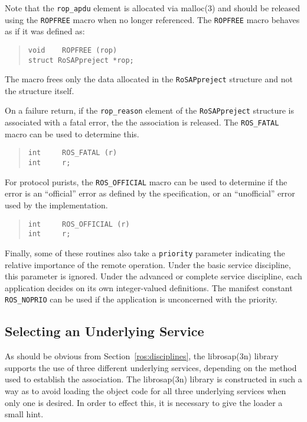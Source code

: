 \empty
Note that the \verb"rop_apdu" element is allocated via \man malloc(3) and
should be released using the \verb"ROPFREE" macro  when no longer referenced.
The \verb"ROPFREE" macro behaves as if it was defined as:
\begin{quote}\small\begin{verbatim}
void    ROPFREE (rop)
struct RoSAPpreject *rop;
\end{verbatim}\end{quote}
The macro frees only the data allocated in the \verb"RoSAPpreject" structure
and not the structure itself.

On a failure return,
if the \verb"rop_reason" element of the \verb"RoSAPpreject" structure is
associated with a fatal error,
the the association is released.
The \verb"ROS_FATAL" macro can be used to determine this.
\begin{quote}\small\begin{verbatim}
int     ROS_FATAL (r)
int     r;
\end{verbatim}\end{quote}
For protocol purists,
the \verb"ROS_OFFICIAL" macro can be used to determine if the error is an
``official'' error as defined by the specification,
or an ``unofficial'' error used by the implementation.
\begin{quote}\small\begin{verbatim}
int     ROS_OFFICIAL (r)
int     r;
\end{verbatim}\end{quote}

Finally,
some of these routines also take a \verb"priority" parameter indicating the
relative importance of the remote operation.
Under the basic service discipline,
this parameter is ignored.
Under the advanced or complete service discipline,
each application decides on its own integer-valued definitions.
The manifest constant \verb"ROS_NOPRIO" can be used if the application is
unconcerned with the priority.

\subsection	{Selecting an Underlying Service}\label{ros:underlying}
As should be obvious from Section~\ref{ros:disciplines},
the \man librosap(3n) library supports the use of three different underlying
services,
depending on the method used to establish the association.
The \man librosap(3n) library is constructed in such a way as to 
avoid loading the object code for all three underlying services
when only one is desired.
In order to effect this,
it is necessary to give the loader a small hint.


